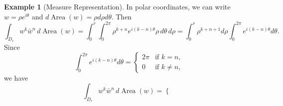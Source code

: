 \documentclass{amsart}
\numberwithin{equation}{section}
\DeclareMathOperator{\Area}{Area}
\theoremstyle{plain}
\theoremstyle{remark}
\theoremstyle{definition}
\newtheorem{example}[subsection]{Example}
\begin{document}
\begin{example}[Measure Representation]
In polar coordinates, we can write $w = \rho e^{i\theta}$ and $d\Area(w) = \rho d\rho d\theta$.
Then
$$
\int_{D_r} w^k \bar{w}^n \, d\Area(w)
= \int_0^r \int_0^{2\pi} \rho^{k+n} e^{i(k-n)\theta} \rho \, d\theta \, d\rho
= \int_0^r \rho^{k+n+1} d\rho \int_0^{2\pi} e^{i(k-n)\theta} d\theta.
$$
Since
$$
\int_0^{2\pi} e^{i(k-n)\theta} d\theta =
\begin{cases}
2\pi & \text{if } k = n, \\
0 & \text{if } k \neq n,
\end{cases}
$$
we have
\begin{equation}\label{eqn:hardyspace}
    \int_{D_r} w^k \bar{w}^n \, d\Area(w) = 
\begin{cases}

\end{cases}
\end{equation}
\end{example}
\end{document}
